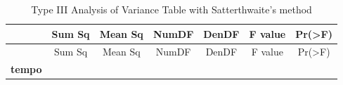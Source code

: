 \documentclass[
]{book}
\begin{document}
\begin{longtable}[]{@{}ccccccc@{}}
\caption{Type III Analysis of Variance Table with Satterthwaite's method}\tabularnewline
\toprule
\begin{minipage}[b]{0.20\columnwidth}\centering
~\strut
\end{minipage} & \begin{minipage}[b]{0.10\columnwidth}\centering
Sum Sq\strut
\end{minipage} & \begin{minipage}[b]{0.11\columnwidth}\centering
Mean Sq\strut
\end{minipage} & \begin{minipage}[b]{0.09\columnwidth}\centering
NumDF\strut
\end{minipage} & \begin{minipage}[b]{0.09\columnwidth}\centering
DenDF\strut
\end{minipage} & \begin{minipage}[b]{0.11\columnwidth}\centering
F value\strut
\end{minipage} & \begin{minipage}[b]{0.11\columnwidth}\centering
Pr(\textgreater F)\strut
\end{minipage}\tabularnewline
\midrule
\endfirsthead
\toprule
\begin{minipage}[b]{0.20\columnwidth}\centering
~\strut
\end{minipage} & \begin{minipage}[b]{0.10\columnwidth}\centering
Sum Sq\strut
\end{minipage} & \begin{minipage}[b]{0.11\columnwidth}\centering
Mean Sq\strut
\end{minipage} & \begin{minipage}[b]{0.09\columnwidth}\centering
NumDF\strut
\end{minipage} & \begin{minipage}[b]{0.09\columnwidth}\centering
DenDF\strut
\end{minipage} & \begin{minipage}[b]{0.11\columnwidth}\centering
F value\strut
\end{minipage} & \begin{minipage}[b]{0.11\columnwidth}\centering
Pr(\textgreater F)\strut
\end{minipage}\tabularnewline
\midrule
\endhead
\begin{minipage}[t]{0.20\columnwidth}\centering
\textbf{tempo}\strut
\end{minipage} & \begin{minipage}[t]{0.10\columnwidth}\centering

\end{minipage}
\end{longtable}
\end{document}
